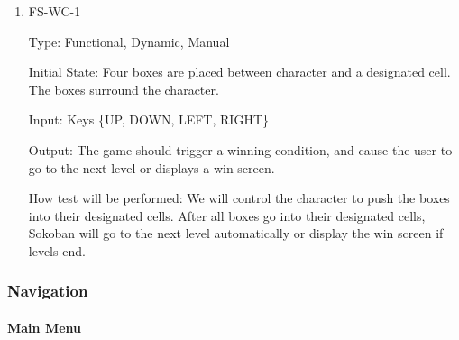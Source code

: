\documentclass[12pt, titlepage]{article}
\begin{document}
\begin{enumerate}

\item{FS-WC-1\\}

Type: Functional, Dynamic, Manual
					
Initial State: Four boxes are placed between character and a designated cell. The boxes surround the character.
					
Input: Keys \{UP, DOWN, LEFT, RIGHT\}
					
Output: The game should trigger a winning condition, and cause the user to go to the next level or displays a win screen. 
					
How test will be performed: We will control the character to push the boxes into their designated cells. After all boxes go into their designated cells, Sokoban will go to the next level automatically or display the win screen if levels end.

\end{enumerate}

\subsubsection{Navigation}

\paragraph{Main Menu}
\end{document}
